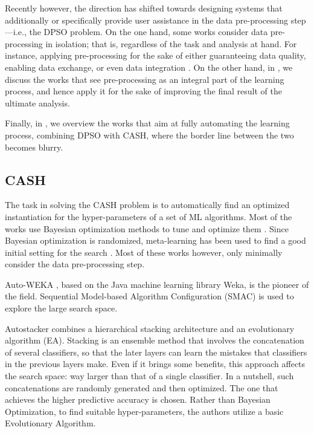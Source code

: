 Recently however, the direction has shifted towards designing systems that additionally or specifically provide user assistance in the data pre-processing step---i.e., the DPSO problem.
On the one hand, some works consider data pre-processing in isolation; that is, regardless of the task and analysis at hand.
For instance, applying pre-processing for the sake of either guaranteeing data quality, enabling data exchange, or even data integration \cite{Llunatic13VLDBEnd,BigDansing15SIGMOD,Katara15SIGMOD,Foofah17SIGMOD}.
On the other hand, in , we discuss the works that see pre-processing as an integral part of the learning process, and hence apply it for the sake of improving the final result of the ultimate analysis.

Finally, in , we overview the works that aim at fully automating the learning process, combining DPSO with CASH, where the border line between the two becomes blurry.

\subsection{CASH}
\label{effective-ssec:cash}
The task in solving the CASH problem is to automatically find an optimized instantiation for the hyper-parameters of a set of ML algorithms.
Most of the works use Bayesian optimization methods to tune and optimize them \cite{Feurer15AutoSklearn,Thornton13AutoWeka,Olson16Tpot}.
Since Bayesian optimization is randomized, meta-learning has been used to find a good initial setting for the search \cite{Feurer15AAAI}.
Most of these works however, only minimally consider the data pre-processing step.

Auto-WEKA \cite{Thornton13AutoWeka}, based on the Java machine learning library Weka, is the pioneer of the field.
Sequential Model-based Algorithm Configuration (SMAC) is used to explore the large search space.

Autostacker \cite{chen2018autostacker} combines a hierarchical stacking architecture and an evolutionary algorithm (EA).
Stacking is an ensemble method that involves the concatenation of several classifiers, so that the later layers can learn the mistakes that classifiers in the previous layers make.
Even if it brings some benefits, this approach affects the search space: way larger than that of a single classifier.
In a nutshell, such concatenations are randomly generated and then optimized.
The one that achieves the higher predictive accuracy is chosen.
Rather than Bayesian Optimization, to find suitable hyper-parameters, the authors utilize a basic Evolutionary Algorithm.

